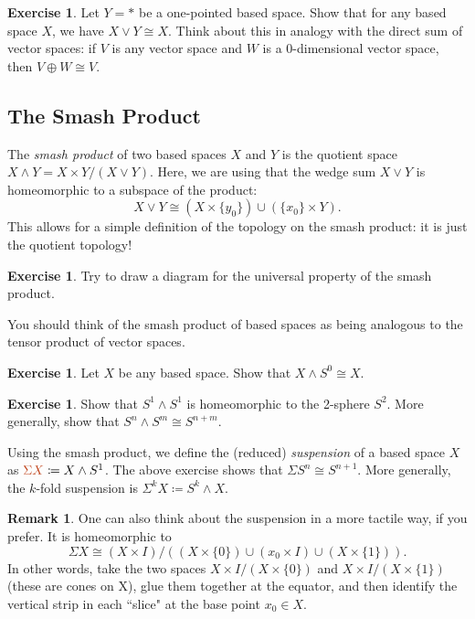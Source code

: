 \documentclass[10pt]{amsart}
\theoremstyle{definition}
\newtheorem{rmk}[thm]{Remark}
\newtheorem{exercise}[thm]{Exercise}
\newcommand{\cdef}[1]{\textcolor{Bittersweet}{#1}}
\begin{document}
\begin{exercise}
    Let $Y = *$ be a one-pointed based space. Show that for any based space $X$, we have $X \vee Y \cong X$. Think about this in analogy with the direct sum of vector spaces: if $V$ is any vector space and $W$ is a 0-dimensional vector space, then $V \oplus W \cong V$.
\end{exercise}

\subsection*{The Smash Product}
The \emph{\cdef{smash product}} of two based spaces $X$ and $Y$ is the quotient space $X \wedge Y = X \times Y /(X \vee Y)$. Here, we are using that the wedge sum $X \vee Y$ is homeomorphic to a subspace of the product:
\[X \vee Y \cong (X \times \{y_0\}) \cup (\{x_0\} \times Y).\]
This allows for a simple definition of the topology on the smash product: it is just the quotient topology!

\begin{exercise}
    Try to draw a diagram for the universal property of the smash product.
\end{exercise}

You should think of the smash product of based spaces as being analogous to the tensor product of vector spaces.

\begin{exercise}
    Let $X$ be any based space. Show that $X \wedge S^0 \cong X.$
\end{exercise}

\begin{exercise}
    Show that $S^1 \wedge S^1$ is homeomorphic to the 2-sphere $S^2$. More generally, show that $S^n \wedge S^m \cong S^{n+m}$.
\end{exercise}

Using the smash product, we define the (reduced) \cdef{\emph{suspension}} of a based space $X$ as $\cdef{\Sigma X} \coloneq X \wedge S^1$. The above exercise shows that $\Sigma S^n \cong S^{n+1}.$ More generally, the $k$-fold suspension is $\Sigma^k X\coloneq S^k \wedge X.$

\begin{rmk}
    One can also think about the suspension in a more tactile way, if you prefer. It is homeomorphic to 
    \[\Sigma X \cong (X \times I)/\left((X \times \{0\}) \cup (x_0 \times I) \cup (X \times \{1\})\right).\]
    In other words, take the two spaces $X \times I/(X \times \{0\})$ and $X \times I/(X \times \{1\})$ (these are \cdef{cones} on X), glue them together at the equator, and then identify the vertical strip in each ``slice" at the base point $x_0 \in X$.
\end{rmk}
\end{document}
